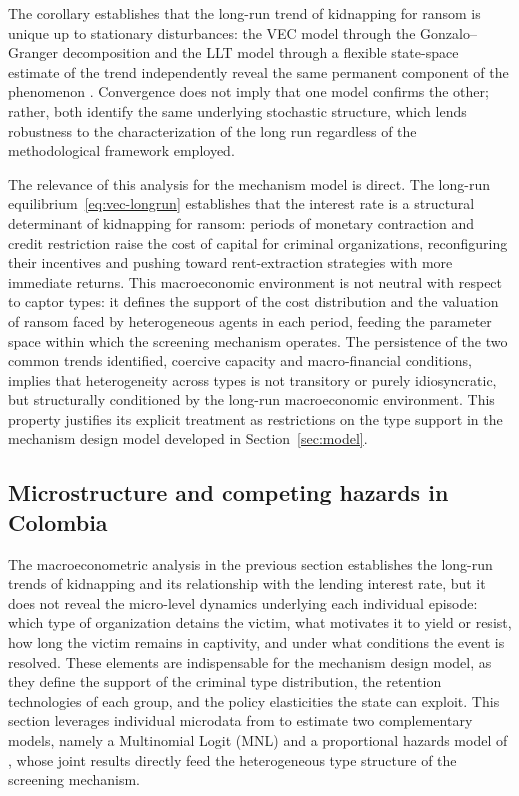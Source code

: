 \documentclass[ecta,nameyear,draft]{econsocart}
\theoremstyle{plain}
\theoremstyle{definition}
\newcommand{\1}{\mathbf{1}}
\begin{document}
The corollary establishes that the long-run trend of kidnapping for ransom is unique up to stationary disturbances: the VEC model through the Gonzalo--Granger decomposition and the LLT model through a flexible state-space estimate of the trend independently reveal the same permanent component of the phenomenon \citet{GonzaloGranger1995}. Convergence does not imply that one model confirms the other; rather, both identify the same underlying stochastic structure, which lends robustness to the characterization of the long run regardless of the methodological framework employed.

The relevance of this analysis for the mechanism model is direct. The long-run equilibrium~\eqref{eq:vec-longrun} establishes that the interest rate is a structural determinant of kidnapping for ransom: periods of monetary contraction and credit restriction raise the cost of capital for criminal organizations, reconfiguring their incentives and pushing toward rent-extraction strategies with more immediate returns. This macroeconomic environment is not neutral with respect to captor types: it defines the support of the cost distribution and the valuation of ransom faced by heterogeneous agents in each period, feeding the parameter space within which the screening mechanism operates. The persistence of the two common trends identified, coercive capacity and macro-financial conditions, implies that heterogeneity across types is not transitory or purely idiosyncratic, but structurally conditioned by the long-run macroeconomic environment. This property justifies its explicit treatment as restrictions on the type support in the mechanism design model developed in Section~\ref{sec:model}.

\subsection{Microstructure and competing hazards in Colombia}\label{sec:empirico}

The macroeconometric analysis in the previous section establishes the long-run trends of kidnapping and its relationship with the lending interest rate, but it does not reveal the micro-level dynamics underlying each individual episode: which type of organization detains the victim, what motivates it to yield or resist, how long the victim remains in captivity, and under what conditions the event is resolved. These elements are indispensable for the mechanism design model, as they define the support of the criminal type distribution, the retention technologies of each group, and the policy elasticities the state can exploit. This section leverages individual microdata from \citet{cnmh_datos} to estimate two complementary models, namely a Multinomial Logit (MNL) and a proportional hazards model of \citet{Cox1972}, whose joint results directly feed the heterogeneous type structure of the screening mechanism.
\end{document}
